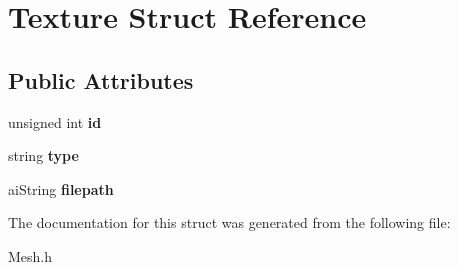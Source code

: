 \hypertarget{struct_texture}{}\section{Texture Struct Reference}
\label{struct_texture}
\subsection*{Public Attributes}
\begin{DoxyCompactItemize}
\item 
\mbox{\label{struct_texture_aed42161a5c00b6020c85833401da6da6}} 
unsigned int {\bfseries id}
\item 
\mbox{\label{struct_texture_adacb495ed5140ec76a09cd130e7d5c32}} 
string {\bfseries type}
\item 
\mbox{\label{struct_texture_a69c8def64c608063b2ecb7fd785121ee}} 
ai\+String {\bfseries filepath}
\end{DoxyCompactItemize}


The documentation for this struct was generated from the following file\+:\begin{DoxyCompactItemize}
\item 
Mesh.\+h\end{DoxyCompactItemize}
